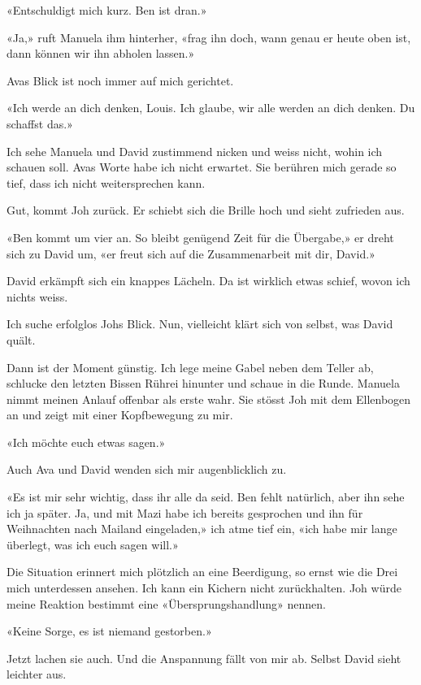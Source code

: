 «Entschuldigt mich kurz. Ben ist dran.»

«Ja,» ruft Manuela ihm hinterher, «frag ihn doch, wann genau er heute
oben ist, dann können wir ihn abholen lassen.»

Avas Blick ist noch immer auf mich gerichtet.

«Ich werde an dich denken, Louis. Ich glaube, wir alle werden an dich
denken. Du schaffst das.»

Ich sehe Manuela und David zustimmend nicken und weiss nicht, wohin ich
schauen soll. Avas Worte habe ich nicht erwartet. Sie berühren mich
gerade so tief, dass ich nicht weitersprechen kann.

Gut, kommt Joh zurück. Er schiebt sich die Brille hoch und sieht
zufrieden aus.

«Ben kommt um vier an. So bleibt genügend Zeit für die Übergabe,» er
dreht sich zu David um, «er freut sich auf die Zusammenarbeit mit dir,
David.»

David erkämpft sich ein knappes Lächeln. Da ist wirklich etwas schief,
wovon ich nichts weiss.

Ich suche erfolglos Johs Blick. Nun, vielleicht klärt sich von selbst,
was David quält.

Dann ist der Moment günstig. Ich lege meine Gabel neben dem Teller ab,
schlucke den letzten Bissen Rührei hinunter und schaue in die Runde.
Manuela nimmt meinen Anlauf offenbar als erste wahr. Sie stösst Joh mit
dem Ellenbogen an und zeigt mit einer Kopfbewegung zu mir.

«Ich möchte euch etwas sagen.»

Auch Ava und David wenden sich mir augenblicklich zu.

«Es ist mir sehr wichtig, dass ihr alle da seid. Ben fehlt natürlich,
aber ihn sehe ich ja später. Ja, und mit Mazi habe ich bereits
gesprochen und ihn für Weihnachten nach Mailand eingeladen,» ich atme
tief ein, «ich habe mir lange überlegt, was ich euch sagen will.»

Die Situation erinnert mich plötzlich an eine Beerdigung, so ernst wie
die Drei mich unterdessen ansehen. Ich kann ein Kichern nicht
zurückhalten. Joh würde meine Reaktion bestimmt eine
«Übersprungshandlung» nennen.

«Keine Sorge, es ist niemand gestorben.»

Jetzt lachen sie auch. Und die Anspannung fällt von mir ab. Selbst David
sieht leichter aus.

